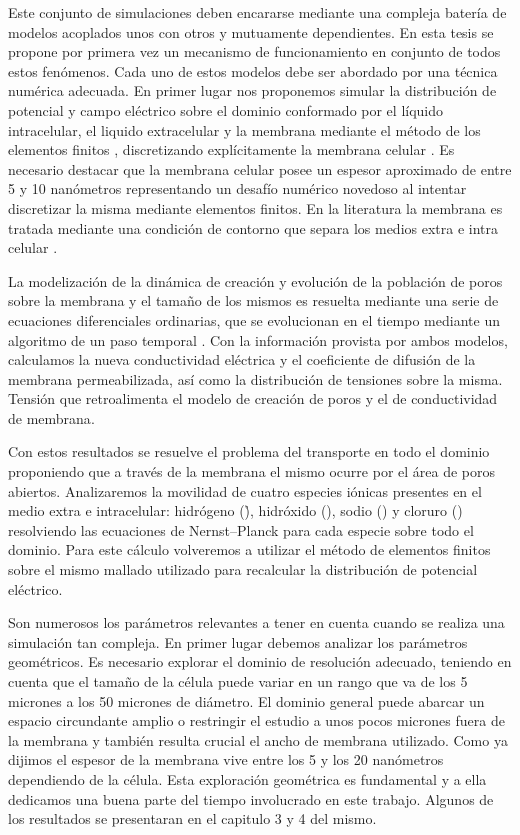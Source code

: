 Este conjunto de simulaciones deben encararse mediante una compleja batería de modelos acoplados unos con otros y mutuamente dependientes. En esta tesis se propone por primera vez un mecanismo de funcionamiento en conjunto de todos estos fenómenos. Cada uno de estos modelos debe ser abordado por una técnica numérica adecuada. En primer lugar nos proponemos simular la distribución de potencial y campo eléctrico sobre el dominio conformado por el líquido intracelular, el liquido extracelular y la membrana mediante el método de los elementos finitos \cite{c9-fem-electro, zien}, discretizando explícitamente la membrana celular \cite{c8}. Es necesario destacar que la membrana celular posee un espesor aproximado de entre 5 y 10 nanómetros representando un desafío numérico novedoso al intentar discretizar la misma mediante elementos finitos. En la literatura la membrana es tratada mediante una condición de contorno que separa los medios extra e intra celular \cite{c12}.

La modelización de la dinámica de creación y evolución de la población de poros sobre la membrana y el tamaño de los mismos es resuelta mediante una serie de ecuaciones diferenciales ordinarias, que se evolucionan en el tiempo mediante un algoritmo de un paso temporal \cite{c15}. Con la información provista por ambos modelos, calculamos la nueva conductividad eléctrica y el coeficiente de difusión de la membrana permeabilizada, así como la distribución de tensiones sobre la misma. Tensión que retroalimenta el modelo de creación de poros y el de conductividad de membrana\cite{c13}.

Con estos resultados se resuelve el problema del transporte en todo el dominio proponiendo que a través de la membrana el mismo ocurre por el área de poros abiertos. Analizaremos la movilidad de cuatro especies iónicas presentes en el medio extra e intracelular: hidrógeno (\h), hidróxido (\oh), sodio (\na) y cloruro (\cl) resolviendo las ecuaciones de Nernst–Planck para cada especie sobre todo el dominio. Para este cálculo volveremos a utilizar el método de elementos finitos sobre el mismo mallado utilizado para recalcular la distribución de potencial eléctrico.

Son numerosos los parámetros relevantes a tener en cuenta cuando se realiza una simulación tan compleja. En primer lugar debemos analizar los parámetros geométricos. Es necesario explorar el dominio de resolución adecuado, teniendo en cuenta que el tamaño de la célula puede variar en un rango que va de los 5 micrones a los 50 micrones de diámetro. El dominio general puede abarcar un espacio circundante amplio o restringir el estudio a unos pocos micrones fuera de la membrana y también resulta crucial el ancho de membrana utilizado. Como ya dijimos el espesor de la membrana vive entre los 5 y los 20 nanómetros dependiendo de la célula. Esta exploración geométrica es fundamental y a ella dedicamos una buena parte del tiempo involucrado en este trabajo. Algunos de los resultados se presentaran en el capitulo 3 y 4 del mismo. 

